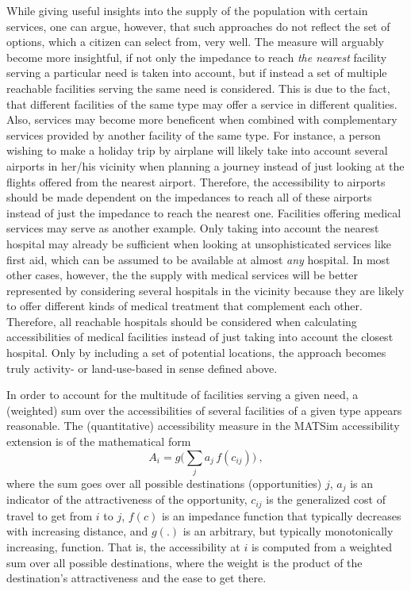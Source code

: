 While giving useful insights into the supply of the population with certain services, one can argue, however, that such approaches do not reflect the set of options, which a citizen can select from, very well. The measure will
arguably become more insightful, if not only the impedance to reach \textit{the nearest} facility serving a particular need is taken into account, but if instead a set of multiple reachable facilities serving the same need is considered. This is due to the fact, that different facilities of the same type may offer a  service in different qualities. Also, services may become more beneficent when combined with complementary services provided by another facility of the same type. For instance, a person wishing to make a holiday trip by airplane will likely take into account several airports in her/his vicinity when planning a journey instead of just looking at the flights offered from the nearest airport. Therefore, the accessibility to airports should be made dependent on the impedances to reach all of these airports instead of just the impedance to reach the nearest one. Facilities offering medical services may serve as another example. Only taking into account the nearest hospital may already be sufficient when looking at unsophisticated services like first aid, which can be assumed to be available at almost \textit{any} hospital. In most other cases, however, the the supply with medical services will be better represented by considering several hospitals in the vicinity because they are likely to offer different kinds of medical treatment that complement each other. Therefore, all reachable hospitals should be considered when calculating accessibilities of medical facilities instead of just taking into account the closest hospital. Only by including a set of potential locations, the approach becomes truly activity- or land-use-based in sense defined above.

In order to account for the multitude of facilities serving a given need, a (weighted) sum over the accessibilities of several facilities of a given type appears reasonable. The (quantitative) accessibility measure in the MATSim accessibility extension is of the mathematical form
\begin{equation}
A_i = g\Big( \sum_j a_j \, f(c_{ij}) \Big) \ ,
\label{eq:accessibility:basic}
\end{equation}
where the sum goes over all possible destinations (opportunities) $j$, $a_j$ is an indicator of the attractiveness of the opportunity, $c_{ij}$ is the generalized cost of travel to get from $i$ to $j$, $f(c)$ is an impedance function that typically decreases with increasing distance, and $g(.)$ is an arbitrary, but typically monotonically increasing, function.  That is, the accessibility at $i$ is computed from a weighted sum over all possible destinations, where the weight is the product of the destination's attractiveness and the ease to get there.

